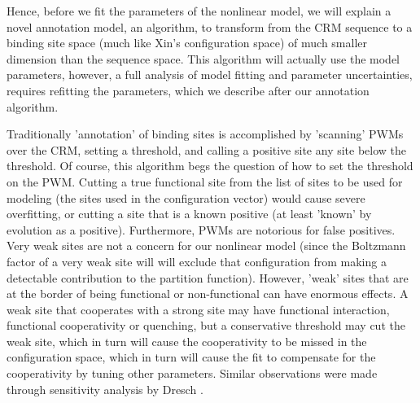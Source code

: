 
Hence, before we fit the parameters of the nonlinear model, we will explain a novel annotation model, an algorithm, to transform from the CRM sequence to a binding site space (much like Xin's configuration space) of much smaller dimension than the sequence space.  This algorithm will actually use the model parameters, however, a full analysis of model fitting and parameter uncertainties, requires refitting the parameters, which we describe after our annotation algorithm.

  Traditionally 'annotation' of binding sites is accomplished by 'scanning' PWMs over the CRM, setting a threshold, and calling a positive site any site below the threshold.  Of course, this algorithm begs the question of how to set the threshold on the PWM.  Cutting a true functional site from the list of sites to be used for modeling (the sites used in the configuration vector) would cause severe overfitting, or cutting a site that is a known positive (at least 'known' by evolution as a positive).  Furthermore, PWMs are notorious for false positives.  Very weak sites are not a concern for our nonlinear model (since the Boltzmann factor of a very weak site will will exclude that configuration from making a detectable contribution to the partition function).  However, 'weak' sites that are at the border of being functional or non-functional can have enormous effects.  A weak site that cooperates with a strong site may have functional interaction, functional cooperativity or quenching, but a conservative threshold may cut the weak site, which in turn will cause the cooperativity to be missed in the configuration space, which in turn will cause the fit to compensate for the cooperativity by tuning other parameters.  Similar observations were made through sensitivity analysis by Dresch \cite{pmid20969803}. 




